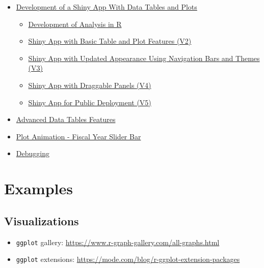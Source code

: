 \documentclass[10pt, letterpaper]{article}
\begin{document}
\begin{spacing}{1.0}
\begin{itemize}
\begin{itemize}
    \end{itemize}
    \item \hyperref[sec:appdev]{Development of a Shiny App With Data Tables and Plots}
      \begin{itemize}
        \item \hyperref[sec:appdev01]{Development of Analysis in R}
        \item \hyperref[sec:appdev02]{Shiny App with Basic Table and Plot Features (V2)}
        \item \hyperref[sec:appdev03]{Shiny App with Updated Appearance Using Navigation Bars and Themes (V3)}
        \item \hyperref[sec:appdev04]{Shiny App with Draggable Panels (V4)}
        \item \hyperref[sec:appdev05]{Shiny App for Public Deployment (V5)}
      \end{itemize}
    \item \hyperref[sec:advtablefeatures]{Advanced Data Tables Features}
    \item \hyperref[sec:sliderbar]{Plot Animation - Fiscal Year Slider Bar}
    \item \hyperref[sec:debug]{Debugging}
\end{itemize}



\section{Examples}\label{sec:examples}

\subsection{Visualizations}\label{sec:examplevis}
\begin{itemize}
    \item \texttt{ggplot} gallery:  \url{https://www.r-graph-gallery.com/all-graphs.html}
    \item \texttt{ggplot} extensions:  \url{https://mode.com/blog/r-ggplot-extension-packages}
\end{itemize}


\end{spacing}
\end{document}

